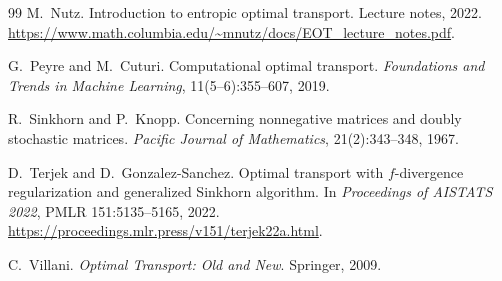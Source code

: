 \documentclass[11pt]{article}
\begin{document}
\begin{thebibliography}{99}
M.~Nutz.
\newblock Introduction to entropic optimal transport.
\newblock Lecture notes, 2022.
\newblock \url{https://www.math.columbia.edu/~mnutz/docs/EOT_lecture_notes.pdf}.

G.~Peyre and M.~Cuturi.
\newblock Computational optimal transport.
\newblock \emph{Foundations and Trends in Machine Learning}, 11(5--6):355--607, 2019.

R.~Sinkhorn and P.~Knopp.
\newblock Concerning nonnegative matrices and doubly stochastic matrices.
\newblock \emph{Pacific Journal of Mathematics}, 21(2):343--348, 1967.

D.~Terjek and D.~Gonzalez-Sanchez.
\newblock Optimal transport with $f$-divergence regularization and generalized Sinkhorn algorithm.
\newblock In \emph{Proceedings of AISTATS 2022}, PMLR 151:5135--5165, 2022.
\newblock \url{https://proceedings.mlr.press/v151/terjek22a.html}.

C.~Villani.
\newblock \emph{Optimal Transport: Old and New}.
\newblock Springer, 2009.

\end{thebibliography}
\end{document}
